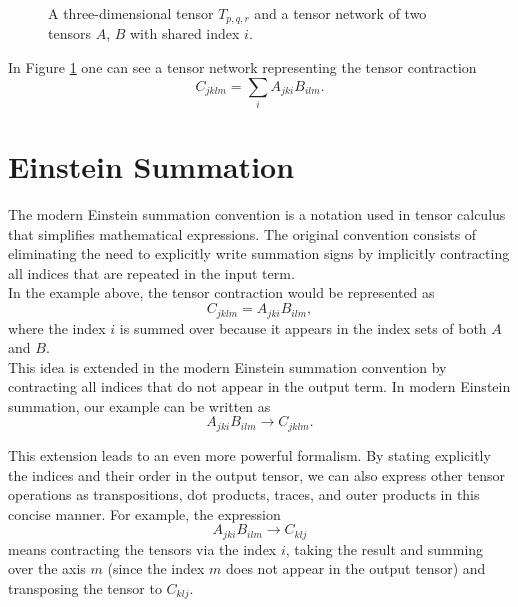 \begin{figure}
\begin{center}
\caption{A three-dimensional tensor $T_{p,q,r}$ and a tensor network of two tensors $A$, $B$ with shared index $i$.}
\label{fig:tensor_network}
\end{center}
\end{figure}

\noindent In Figure \ref{fig:tensor_network} one can see a tensor network representing the tensor contraction 
$$
C_{jklm} = \sum_{i} A_{jki} B_{ilm}.
$$

\section{Einstein Summation}
The modern Einstein summation convention is a notation used in tensor calculus that simplifies mathematical expressions. The original convention consists of eliminating the need to explicitly write summation signs by implicitly contracting all indices that are repeated in the input term. \\
In the example above, the tensor contraction would be represented as
$$C_{jklm} = A_{jki} B_{ilm} ,$$
\noindent where the index $i$ is summed over because it appears in the index sets of both $A$ and $B$.\\
This idea is extended in the modern Einstein summation convention by contracting all indices that do not appear in the output term. In modern Einstein summation, our example can be written as
$$A_{jki} B_{ilm} \rightarrow C_{jklm}.$$

This extension leads to an even more powerful formalism. By stating explicitly the indices and their order in the output tensor, we can also express other tensor operations as transpositions, dot products, traces, and outer products in this concise manner.
For example, the expression
$$A_{jki} B_{ilm} \rightarrow C_{klj}$$
means contracting the tensors via the index $i$, taking the result and summing over the axis $m$ (since the index $m$ does not appear in the output tensor) and transposing the tensor to $ C_{klj}$. \\


